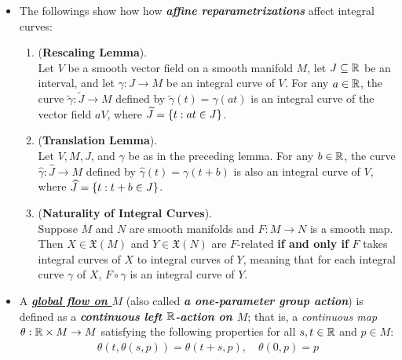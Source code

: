 \documentclass[11pt]{article}
\begin{document}
\begin{itemize}
\item \begin{remark}
The followings show how how \emph{\textbf{affine reparametrizations}} affect integral curves:
\begin{enumerate}
\item 
\begin{lemma} (\textbf{Rescaling Lemma}). \citep{lee2003introduction}\\
Let $V$ be a smooth vector field on a smooth manifold $M$, let $J \subseteq {\mathbb R}$ be an interval, and let $\gamma: J \rightarrow M$ be an integral curve of $V$. For any $a \in {\mathbb R}$, the curve $\widetilde{\gamma}: \widetilde{J} \rightarrow M$ defined by $\widetilde{\gamma}(t) =  \gamma(at)$ is an integral curve of the vector field $aV$, where $\widetilde{J} = \left\{t: at \in J\right\}$. 
\end{lemma}

\item \begin{lemma} (\textbf{Translation Lemma}).  \citep{lee2003introduction}\\
Let $V, M, J$, and $\gamma$ be as in the preceding lemma. For any $b \in {\mathbb R}$, the curve $\widehat{\gamma}:  \widehat{J} \rightarrow M$ defined by $\widehat{\gamma}(t) =  \gamma(t + b)$ is also an integral curve of $V$, where $ \widehat{J} = \left\{t: t + b \in J\right\}$.
\end{lemma}

\item \begin{proposition} (\textbf{Naturality of Integral Curves}).  \citep{lee2003introduction}\\
Suppose $M$ and $N$ are smooth manifolds and $F: M \rightarrow N$ is a smooth map. Then $X \in \mathfrak{X}(M)$ and $Y \in \mathfrak{X}(N)$ are $F$-related \textbf{if and only if} $F$ takes integral curves of $X$ to integral curves of $Y$, meaning that for each integral curve $\gamma$ of $X$,  $F \circ \gamma$ is an integral curve of $Y$.
\end{proposition}
\end{enumerate}
\end{remark}

\item \begin{definition}
A \underline{\emph{\textbf{global flow on $M$}}} (also called \textbf{\emph{a one-parameter group action}}) is defined as a \emph{\textbf{continuous left ${\mathbb R}$-action on $M$}}; that is, a \emph{continuous map} $\theta: {\mathbb R} \times M \rightarrow M$ satisfying the following properties for all $s, t \in {\mathbb R}$ and $p \in M$:
\begin{align}
\theta(t, \theta(s, p)) = \theta(t+s, p), \quad \theta(0, p) = p \label{eqn: global_flow}
\end{align}
\end{definition}


\end{itemize}
\end{document}
